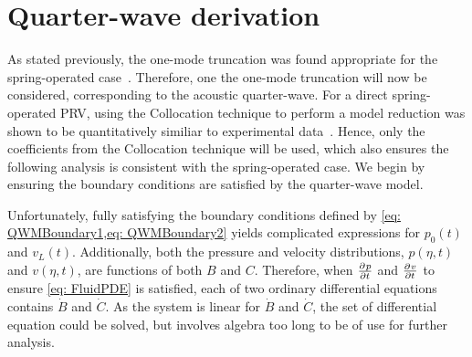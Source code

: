 \section{Quarter-wave derivation} \label{subsec: QWM Derivation}

As stated previously, the one-mode truncation was found appropriate for the spring-operated case~\cite{Hos2015ModelPipe}. Therefore, one the one-mode truncation will now be considered, corresponding to the acoustic quarter-wave. For a direct spring-operated PRV, using the Collocation technique to perform a model reduction was shown to be quantitatively similiar to experimental data~\cite{Hos2015DynamicModelling}. Hence, only the coefficients from the Collocation technique will be used, which also ensures the following analysis is consistent with the spring-operated case. We begin by ensuring the boundary conditions are satisfied by the quarter-wave model.
%

Unfortunately, fully satisfying the boundary conditions defined by \cref{eq: QWMBoundary1,eq: QWMBoundary2} yields complicated expressions for $p_0(t)$ and $v_L(t)$.
% 
Additionally, both the pressure and velocity distributions, $p(\eta,t)$ and $v(\eta,t)$, are functions of both $B$ and $C$. Therefore, when $\pdiff{p}{t}$ and $\pdiff{v}{t}$ to ensure \cref{eq: FluidPDE} is satisfied, each of two ordinary differential equations contains $\dot{B}$ and $\dot{C}$.
As the system is linear for $\dot{B}$ and $\dot{C}$, the set of differential equation could be solved, but involves algebra too long to be of use for further analysis.

